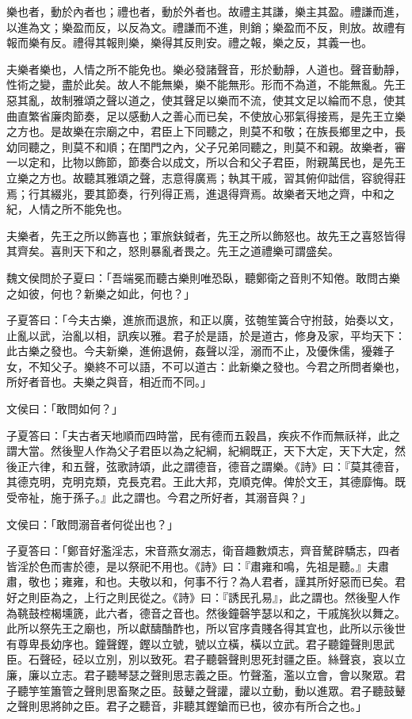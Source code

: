 \begin{pinyinscope}
樂也者，動於內者也；禮也者，動於外者也。故禮主其謙，樂主其盈。禮謙而進，以進為文；樂盈而反，以反為文。禮謙而不進，則銷；樂盈而不反，則放。故禮有報而樂有反。禮得其報則樂，樂得其反則安。禮之報，樂之反，其義一也。

夫樂者樂也，人情之所不能免也。樂必發諸聲音，形於動靜，人道也。聲音動靜，性術之變，盡於此矣。故人不能無樂，樂不能無形。形而不為道，不能無亂。先王惡其亂，故制雅頌之聲以道之，使其聲足以樂而不流，使其文足以綸而不息，使其曲直繁省廉肉節奏，足以感動人之善心而已矣，不使放心邪氣得接焉，是先王立樂之方也。是故樂在宗廟之中，君臣上下同聽之，則莫不和敬；在族長鄉里之中，長幼同聽之，則莫不和順；在閨門之內，父子兄弟同聽之，則莫不和親。故樂者，審一以定和，比物以飾節，節奏合以成文，所以合和父子君臣，附親萬民也，是先王立樂之方也。故聽其雅頌之聲，志意得廣焉；執其干戚，習其俯仰詘信，容貌得莊焉；行其綴兆，要其節奏，行列得正焉，進退得齊焉。故樂者天地之齊，中和之紀，人情之所不能免也。

夫樂者，先王之所以飾喜也；軍旅鈇鉞者，先王之所以飾怒也。故先王之喜怒皆得其齊矣。喜則天下和之，怒則暴亂者畏之。先王之道禮樂可謂盛矣。

魏文侯問於子夏曰：「吾端冕而聽古樂則唯恐臥，聽鄭衛之音則不知倦。敢問古樂之如彼，何也？新樂之如此，何也？」

子夏答曰：「今夫古樂，進旅而退旅，和正以廣，弦匏笙簧合守拊鼓，始奏以文，止亂以武，治亂以相，訊疾以雅。君子於是語，於是道古，修身及家，平均天下：此古樂之發也。今夫新樂，進俯退俯，姦聲以淫，溺而不止，及優侏儒，獶雜子女，不知父子。樂終不可以語，不可以道古：此新樂之發也。今君之所問者樂也，所好者音也。夫樂之與音，相近而不同。」

文侯曰：「敢問如何？」

子夏答曰：「夫古者天地順而四時當，民有德而五穀昌，疾疢不作而無祅祥，此之謂大當。然後聖人作為父子君臣以為之紀綱，紀綱既正，天下大定，天下大定，然後正六律，和五聲，弦歌詩頌，此之謂德音，德音之謂樂。《詩》曰：『莫其德音，其德克明，克明克類，克長克君。王此大邦，克順克俾。俾於文王，其德靡悔。既受帝祉，施于孫子。』此之謂也。今君之所好者，其溺音與？」

文侯曰：「敢問溺音者何從出也？」

子夏答曰：「鄭音好濫淫志，宋音燕女溺志，衛音趣數煩志，齊音驁辟驕志，四者皆淫於色而害於德，是以祭祀不用也。《詩》曰：『肅雍和鳴，先祖是聽。』夫肅肅，敬也；雍雍，和也。夫敬以和，何事不行？為人君者，謹其所好惡而已矣。君好之則臣為之，上行之則民從之。《詩》曰：『誘民孔易』，此之謂也。然後聖人作為鞉鼓椌楬壎篪，此六者，德音之音也。然後鐘磬竽瑟以和之，干戚旄狄以舞之。此所以祭先王之廟也，所以獻醻酳酢也，所以官序貴賤各得其宜也，此所以示後世有尊卑長幼序也。鐘聲鏗，鏗以立號，號以立橫，橫以立武。君子聽鐘聲則思武臣。石聲硁，硁以立別，別以致死。君子聽磬聲則思死封疆之臣。絲聲哀，哀以立廉，廉以立志。君子聽琴瑟之聲則思志義之臣。竹聲濫，濫以立會，會以聚眾。君子聽竽笙簫管之聲則思畜聚之臣。鼓鼙之聲讙，讙以立動，動以進眾。君子聽鼓鼙之聲則思將帥之臣。君子之聽音，非聽其鏗鎗而已也，彼亦有所合之也。」


\end{pinyinscope}
